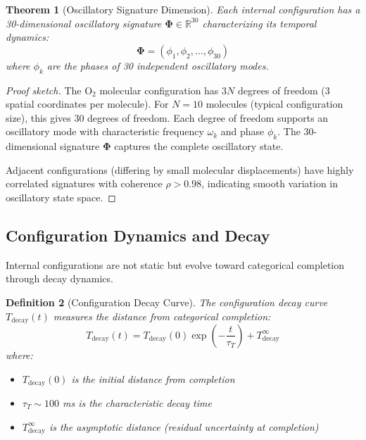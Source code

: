 \documentclass[aps,prd,twocolumn,superscriptaddress,floatfix,nofootinbib]{revtex4-2}
\newtheorem{theorem}{Theorem}[section]
\newtheorem{definition}[theorem]{Definition}
\theoremstyle{remark}
\begin{document}
\begin{theorem}[Oscillatory Signature Dimension]
\label{thm:osc_dimension}
Each internal configuration has a 30-dimensional oscillatory signature $\boldsymbol{\Phi} \in \mathbb{R}^{30}$ characterizing its temporal dynamics:
\begin{equation}
\boldsymbol{\Phi} = (\phi_1, \phi_2, \ldots, \phi_{30})
\end{equation}
where $\phi_k$ are the phases of 30 independent oscillatory modes.
\end{theorem}

\begin{proof}[Proof sketch]
The O$_2$ molecular configuration has $3N$ degrees of freedom (3 spatial coordinates per molecule). For $N = 10$ molecules (typical configuration size), this gives 30 degrees of freedom. Each degree of freedom supports an oscillatory mode with characteristic frequency $\omega_k$ and phase $\phi_k$. The 30-dimensional signature $\boldsymbol{\Phi}$ captures the complete oscillatory state.

Adjacent configurations (differing by small molecular displacements) have highly correlated signatures with coherence $\rho > 0.98$, indicating smooth variation in oscillatory state space.
\end{proof}

\subsection{Configuration Dynamics and Decay}

Internal configurations are not static but evolve toward categorical completion through decay dynamics.

\begin{definition}[Configuration Decay Curve]
\label{def:thought_decay}
The configuration decay curve $T_{\text{decay}}(t)$ measures the distance from categorical completion:
\begin{equation}
T_{\text{decay}}(t) = T_{\text{decay}}(0) \exp\left(-\frac{t}{\tau_T}\right) + T_{\text{decay}}^{\infty}
\end{equation}
where:
\begin{itemize}
\item $T_{\text{decay}}(0)$ is the initial distance from completion
\item $\tau_T \sim 100$ ms is the characteristic decay time~\cite{engel2001dynamic}
\item $T_{\text{decay}}^{\infty}$ is the asymptotic distance (residual uncertainty at completion)
\end{itemize}
\end{definition}
\end{document}
